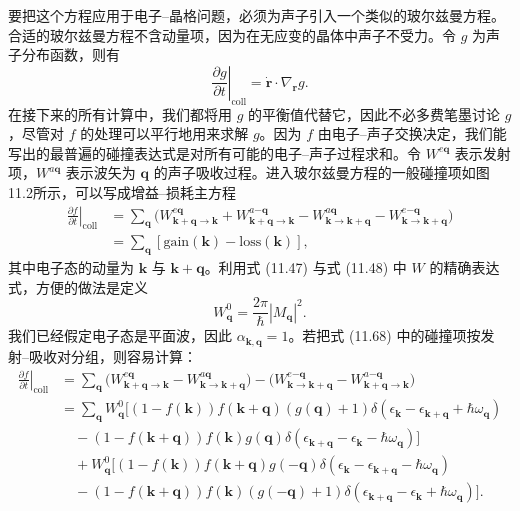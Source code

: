要把这个方程应用于电子–晶格问题，必须为声子引入一个类似的玻尔兹曼方程。合适的玻尔兹曼方程不含动量项，因为在无应变的晶体中声子不受力。令 $g$ 为声子分布函数，则有
\begin{equation*}
\left.\frac{\partial g}{\partial t}\right|_{\mathrm{coll}}=\dot{\mathbf{r}}\cdot\nabla_{\mathbf{r}}g.\tag{11.66}
\end{equation*}
在接下来的所有计算中，我们都将用 $g$ 的平衡值代替它，因此不必多费笔墨讨论 $g$，尽管对 $f$ 的处理可以平行地用来求解 $g$。因为 $f$ 由电子–声子交换决定，我们能写出的最普遍的碰撞表达式是对所有可能的电子–声子过程求和。令 $W^{e\mathbf{q}}$ 表示发射项，$W^{a\mathbf{q}}$ 表示波矢为 $\mathbf{q}$ 的声子吸收过程。进入玻尔兹曼方程的一般碰撞项如图11.2所示，可以写成增益–损耗主方程
\begin{align*}
\left.\frac{\partial f}{\partial t}\right|_{\mathrm{coll}}&=\sum_{\mathbf{q}}\bigl(W^{e\mathbf{q}}_{\mathbf{k}+\mathbf{q}\to\mathbf{k}}+W^{a\mathbf{-q}}_{\mathbf{k}+\mathbf{q}\to\mathbf{k}}-W^{a\mathbf{q}}_{\mathbf{k}\to\mathbf{k}+\mathbf{q}}-W^{e\mathbf{-q}}_{\mathbf{k}\to\mathbf{k}+\mathbf{q}}\bigr)\\
&=\sum_{\mathbf{q}}[\mathrm{gain}(\mathbf{k})-\mathrm{loss}(\mathbf{k})],\tag{11.67}
\end{align*}
其中电子态的动量为 $\mathbf{k}$ 与 $\mathbf{k}+\mathbf{q}$。利用式 (11.47) 与式 (11.48) 中 $W$ 的精确表达式，方便的做法是定义
\begin{equation*}
W^0_{\mathbf{q}}=\frac{2\pi}{\hbar}|M_{\mathbf{q}}|^2.\tag{11.68}
\end{equation*}
我们已经假定电子态是平面波，因此 $\alpha_{\mathbf{k},\mathbf{q}}=1$。若把式 (11.68) 中的碰撞项按发射–吸收对分组，则容易计算：
\begin{align*}
\left.\frac{\partial f}{\partial t}\right|_{\mathrm{coll}}&=\sum_{\mathbf{q}}\bigl(W^{e\mathbf{q}}_{\mathbf{k}+\mathbf{q}\to\mathbf{k}}-W^{a\mathbf{q}}_{\mathbf{k}\to\mathbf{k}+\mathbf{q}}\bigr)-\bigl(W^{e\mathbf{-q}}_{\mathbf{k}\to\mathbf{k}+\mathbf{q}}-W^{a\mathbf{-q}}_{\mathbf{k}+\mathbf{q}\to\mathbf{k}}\bigr)\\
&=\sum_{\mathbf{q}}W^0_{\mathbf{q}}\bigl[(1-f(\mathbf{k}))f(\mathbf{k}+\mathbf{q})(g(\mathbf{q})+1)\delta(\epsilon_{\mathbf{k}}-\epsilon_{\mathbf{k}+\mathbf{q}}+\hbar\omega_{\mathbf{q}})\\
&\quad -(1-f(\mathbf{k}+\mathbf{q}))f(\mathbf{k})g(\mathbf{q})\delta(\epsilon_{\mathbf{k}+\mathbf{q}}-\epsilon_{\mathbf{k}}-\hbar\omega_{\mathbf{q}})\bigr]\\
&\quad +W^0_{\mathbf{q}}\bigl[(1-f(\mathbf{k}))f(\mathbf{k}+\mathbf{q})g(-\mathbf{q})\delta(\epsilon_{\mathbf{k}}-\epsilon_{\mathbf{k}+\mathbf{q}}-\hbar\omega_{\mathbf{q}})\\
&\quad -(1-f(\mathbf{k}+\mathbf{q}))f(\mathbf{k})(g(-\mathbf{q})+1)\delta(\epsilon_{\mathbf{k}+\mathbf{q}}-\epsilon_{\mathbf{k}}+\hbar\omega_{\mathbf{q}})\bigr].\tag{11.69}
\end{align*}

